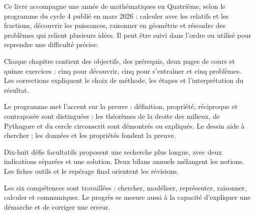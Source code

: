 \clearpage\thispagestyle{otFront}\label{avant-propos}\fontsize{11}{15}\selectfont

Ce livre accompagne une année de mathématiques en Quatrième, selon le
programme du cycle 4 publié en mars 2026 : calculer avec les relatifs et les
fractions, découvrir les puissances, raisonner en géométrie et résoudre des
problèmes qui relient plusieurs idées. Il peut être suivi dans l’ordre ou
utilisé pour reprendre une difficulté précise.\par\medskip
\begin{savoirfaire}Chaque chapitre contient des objectifs, des prérequis, deux pages de cours et quinze exercices : cinq pour découvrir, cinq pour s’entraîner et cinq problèmes. Les corrections expliquent le choix de méthode, les étapes et l’interprétation du résultat.\end{savoirfaire}
\begin{savoirfaire}Le programme met l’accent sur la preuve : définition, propriété, réciproque et contraposée sont distinguées ; les théorèmes de la droite des milieux, de Pythagore et du cercle circonscrit sont démontrés ou expliqués. Le dessin aide à chercher ; les données et les propriétés fondent la preuve.\end{savoirfaire}
\begin{savoirfaire}Dix-huit défis facultatifs proposent une recherche plus longue, avec deux indications séparées et une solution. Deux bilans annuels mélangent les notions. Les fiches outils et le repérage final orientent les révisions.\end{savoirfaire}
Les six compétences sont travaillées : chercher, modéliser, représenter,
raisonner, calculer et communiquer. Le progrès se mesure aussi à la capacité
d’expliquer une démarche et de corriger une erreur.

\clearpage
